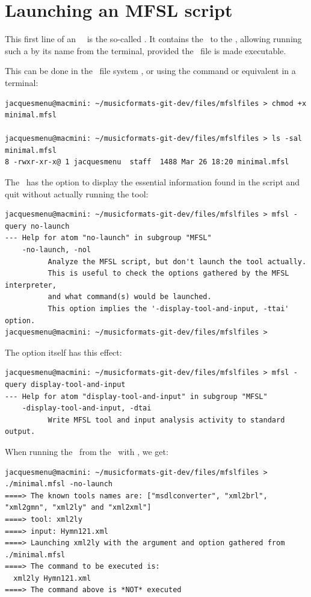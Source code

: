 \section{Launching an MFSL script}

This first line of an \mfslLang\ \script\ is the so-called . It contains the \filePath\ to the \mfslLangInterp, allowing running such a \script by its name from the terminal, provided the \script\ file is made executable.

This can be done in the \OS\ file system \GUI, or using the  command or equivalent in a terminal:
\begin{lstlisting}[language=Terminal]
jacquesmenu@macmini: ~/musicformats-git-dev/files/mfslfiles > chmod +x minimal.mfsl

jacquesmenu@macmini: ~/musicformats-git-dev/files/mfslfiles > ls -sal minimal.mfsl
8 -rwxr-xr-x@ 1 jacquesmenu  staff  1488 Mar 26 18:20 minimal.mfsl
\end{lstlisting}

The \mfslLangInterp\ has the  option to display the essential information found in the script and quit without actually running the tool:
\begin{lstlisting}[language=Terminal]
jacquesmenu@macmini: ~/musicformats-git-dev/files/mfslfiles > mfsl -query no-launch
--- Help for atom "no-launch" in subgroup "MFSL"
    -no-launch, -nol
          Analyze the MFSL script, but don't launch the tool actually.
          This is useful to check the options gathered by the MFSL interpreter,
          and what command(s) would be launched.
          This option implies the '-display-tool-and-input, -ttai' option.
jacquesmenu@macmini: ~/musicformats-git-dev/files/mfslfiles >
\end{lstlisting}

The  option itself has this effect:
\begin{lstlisting}[language=Terminal]
jacquesmenu@macmini: ~/musicformats-git-dev/files/mfslfiles > mfsl -query display-tool-and-input
--- Help for atom "display-tool-and-input" in subgroup "MFSL"
    -display-tool-and-input, -dtai
          Write MFSL tool and input analysis activity to standard output.
\end{lstlisting}

When running the  \script\ from the \CLI\ with , we get:
\begin{lstlisting}[language=Terminal]
jacquesmenu@macmini: ~/musicformats-git-dev/files/mfslfiles > ./minimal.mfsl -no-launch
====> The known tools names are: ["msdlconverter", "xml2brl", "xml2gmn", "xml2ly" and "xml2xml"]
====> tool: xml2ly
====> input: Hymn121.xml
====> Launching xml2ly with the argument and option gathered from ./minimal.mfsl
====> The command to be executed is:
  xml2ly Hymn121.xml
====> The command above is *NOT* executed
\end{lstlisting}

